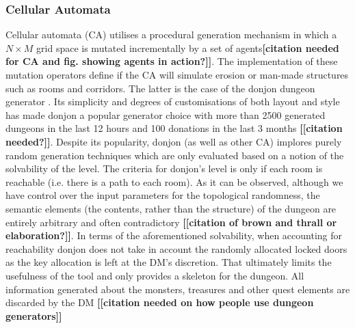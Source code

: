 \documentclass{UoYCSproject}
\begin{document}
\subsubsection{Cellular Automata}
Cellular automata (CA) utilises a procedural generation mechanism in which a $N \times M$ grid space is mutated incrementally by a set of agents\textbf{[citation needed for CA and fig. showing agents in action?]]}. The implementation of these mutation operators define if the CA will simulate erosion \parencite{donjonCA} or man-made structures such as rooms and corridors. The latter is the case of the donjon dungeon generator \parencite{donjonPDG}. Its simplicity and degrees of customisations of both layout and style has made donjon a popular generator choice with more than 2500 generated dungeons in the last 12 hours and 100 donations in the last 3 months \textbf{[[citation needed?]]}. Despite its popularity, donjon (as well as other CA) implores purely random generation techniques which are only evaluated based on a notion of the solvability of the level. The criteria for donjon's level is only if each room is reachable (i.e. there is a path to each room). As it can be observed, although we have control over the input parameters for the topological randomness, the semantic elements (the contents, rather than the structure) of the dungeon are entirely arbitrary and often contradictory \textbf{[[citation of brown and thrall or elaboration?]]}. In terms of the aforementioned solvability, when accounting for reachability donjon does not take in account the randomly allocated locked doors as the key allocation is left at the DM's discretion. That ultimately limits the usefulness of the tool and only provides a skeleton for the dungeon. All information generated about the monsters, treasures and other quest elements are discarded by the DM \textbf{[[citation needed on how people use dungeon generators]]}
\end{document}
